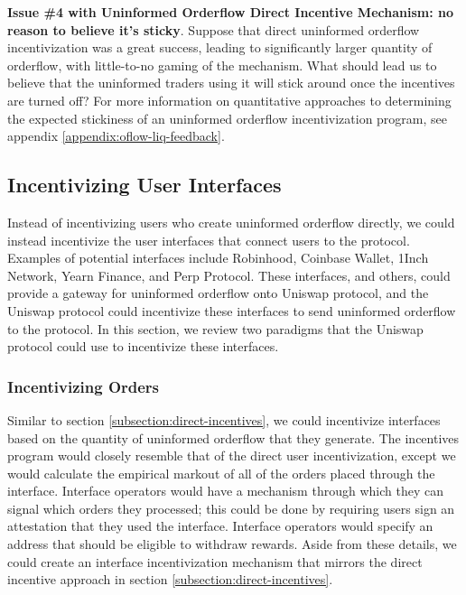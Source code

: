     \textbf{Issue \#4 with Uninformed Orderflow Direct Incentive Mechanism: no reason to believe it's sticky}.
    Suppose that direct uninformed orderflow incentivization was a great success, leading to significantly larger quantity of orderflow, with little-to-no gaming of the mechanism. What should lead us to believe that the uninformed traders using it will stick around once the incentives are turned off?
    For more information on quantitative approaches to determining the expected stickiness of an uninformed orderflow incentivization program, see appendix \ref{appendix:oflow-liq-feedback}.

\subsection{Incentivizing User Interfaces} \label{subsection:interface-incentives}
    Instead of incentivizing users who create uninformed orderflow directly, we could instead incentivize the user interfaces that connect users to the protocol. Examples of potential interfaces include Robinhood, Coinbase Wallet, 1Inch Network, Yearn Finance, and Perp Protocol. These interfaces, and others, could provide a gateway for uninformed orderflow onto Uniswap protocol, and the Uniswap protocol could incentivize these interfaces to send uninformed orderflow to the protocol. In this section, we review two paradigms that the Uniswap protocol could use to incentivize these interfaces.

    \subsubsection{Incentivizing Orders}
        Similar to section \ref{subsection:direct-incentives}, we could incentivize interfaces based on the quantity of uninformed orderflow that they generate. The incentives program would closely resemble that of the direct user incentivization, except we would calculate the empirical markout of all of the orders placed through the interface. Interface operators would have a mechanism through which they can signal which orders they processed; this could be done by requiring users sign an attestation that they used the interface. Interface operators would specify an address that should be eligible to withdraw rewards. Aside from these details, we could create an interface incentivization mechanism that mirrors the direct incentive approach in section \ref{subsection:direct-incentives}.

